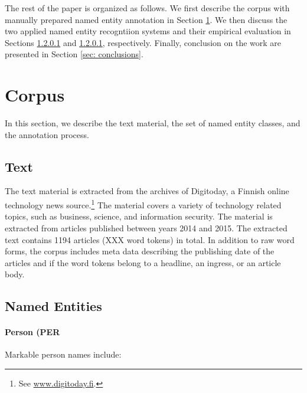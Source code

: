 \documentclass[11pt]{article}
\begin{document}
The rest of the paper is organized as follows. We first describe the corpus with manually prepared named entity annotation in Section \ref{sec: corpus}. We then discuss the two applied named entity recogntiion systems and their empirical evaluation in Sections \ref{} and \ref{}, respectively.  
Finally, conclusion on the work are presented in Section \ref{sec: conclusions}.




\section{Corpus}
\label{sec: corpus}

In this section, we describe the text material, the set of named entity classes, and the annotation process.

\subsection{Text}
\label{sec: text}

The text material is extracted from the archives of Digitoday, a Finnish online technology news source.\footnote{See \url{www.digitoday.fi}.} The material covers a variety of technology related topics, such as business, science, and information security.  The material is extracted from articles published between years 2014 and 2015. The extracted text contains 1194 articles (XXX word tokens) in total. In addition to raw word forms, the corpus includes meta data describing the publishing date of the articles and if the word tokens belong to a headline, an ingress, or an article body. 


\subsection{Named Entities}
\label{sec: named entities}



\paragraph{Person (PER}

Markable person names include:
\end{document}
